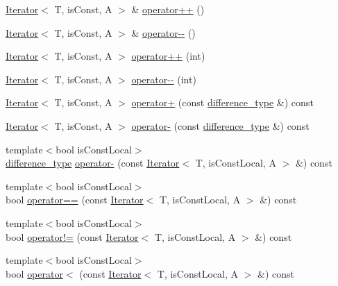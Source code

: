 \begin{DoxyCompactItemize}
\item 
\hyperlink{classandres_1_1Iterator}{Iterator}$<$ T, is\+Const, A $>$ \& \hyperlink{classandres_1_1Iterator_aa25f91324c261608591f0d072afa8ac2}{operator++} ()
\item 
\hyperlink{classandres_1_1Iterator}{Iterator}$<$ T, is\+Const, A $>$ \& \hyperlink{classandres_1_1Iterator_a2e7a4ffd36e64600b7a785dd5fcf9920}{operator-\/-\/} ()
\item 
\hyperlink{classandres_1_1Iterator}{Iterator}$<$ T, is\+Const, A $>$ \hyperlink{classandres_1_1Iterator_a3f16288a75cc46f0f597da32d4af4cc8}{operator++} (int)
\item 
\hyperlink{classandres_1_1Iterator}{Iterator}$<$ T, is\+Const, A $>$ \hyperlink{classandres_1_1Iterator_acfde3bc208623f9105a8ea0d5103aec3}{operator-\/-\/} (int)
\item 
\hyperlink{classandres_1_1Iterator}{Iterator}$<$ T, is\+Const, A $>$ \hyperlink{classandres_1_1Iterator_a3777cbd5f8b239d4fae5ba457b6820dc}{operator+} (const \hyperlink{classandres_1_1Iterator_a10f8053d87b6b597d9fe011f66a240ca}{difference\+\_\+type} \&) const
\item 
\hyperlink{classandres_1_1Iterator}{Iterator}$<$ T, is\+Const, A $>$ \hyperlink{classandres_1_1Iterator_aba616b917d32ebbe2535d6906c89d373}{operator-\/} (const \hyperlink{classandres_1_1Iterator_a10f8053d87b6b597d9fe011f66a240ca}{difference\+\_\+type} \&) const
\item 
{\footnotesize template$<$bool is\+Const\+Local$>$ }\\\hyperlink{classandres_1_1Iterator_a10f8053d87b6b597d9fe011f66a240ca}{difference\+\_\+type} \hyperlink{classandres_1_1Iterator_a3aa56c16988a94b6bff8267bd73814ac}{operator-\/} (const \hyperlink{classandres_1_1Iterator}{Iterator}$<$ T, is\+Const\+Local, A $>$ \&) const
\item 
{\footnotesize template$<$bool is\+Const\+Local$>$ }\\bool \hyperlink{classandres_1_1Iterator_abfe4d2b016415ed309b845dab09eff59}{operator==} (const \hyperlink{classandres_1_1Iterator}{Iterator}$<$ T, is\+Const\+Local, A $>$ \&) const
\item 
{\footnotesize template$<$bool is\+Const\+Local$>$ }\\bool \hyperlink{classandres_1_1Iterator_a62860af14494290007b383421f32e0f6}{operator!=} (const \hyperlink{classandres_1_1Iterator}{Iterator}$<$ T, is\+Const\+Local, A $>$ \&) const
\item 
{\footnotesize template$<$bool is\+Const\+Local$>$ }\\bool \hyperlink{classandres_1_1Iterator_a45a23d62f4675ef17b113b0e93f4fcf9}{operator$<$} (const \hyperlink{classandres_1_1Iterator}{Iterator}$<$ T, is\+Const\+Local, A $>$ \&) const

\end{DoxyCompactItemize}
